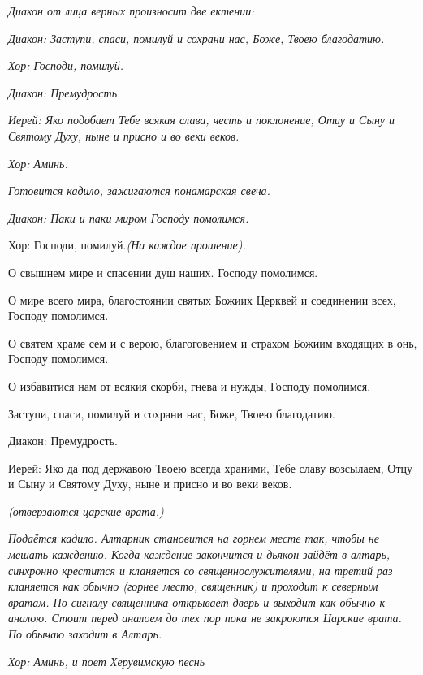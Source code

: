 \itshape Диакон от лица верных произносит две ектении:\normalfont{}


 \itshape  Диакон:\normalfont{} Заступи, спаси, помилуй и сохрани нас, Боже, Твоею благодатию.


\itshape Хор:\normalfont{} Господи, помилуй.


\itshape Диакон:\normalfont{} Премудрость.


\itshape  Иерей:\normalfont{} Яко подобает Тебе всякая слава, честь и поклонение, Отцу и Сыну и Святому Духу, ныне и присно и во веки веков.


\itshape  Хор:\normalfont{} Аминь.


\itshape  Готовится кадило, зажигаются понамарская свеча.\normalfont{}


 \itshape  Диакон:\normalfont{} Паки и паки миром Господу помолимся. \itshape  


  Хор:\normalfont{} Господи, помилуй.\itshape  (На каждое прошение)\normalfont{}. 


  О свышнем мире и спасении душ наших. Господу помолимся. 


  О мире всего мира, благостоянии святых Божиих Церквей и соединении всех, Господу помолимся. 


  О святем храме сем и с верою, благоговением и страхом Божиим входящих в онь, Господу помолимся. 


  О избавитися нам от всякия скорби, гнева и нужды, Господу помолимся. 


  Заступи, спаси, помилуй и сохрани нас, Боже, Твоею благодатию. \itshape 


  Диакон:\normalfont{} Премудрость. \itshape 


  Иерей:\normalfont{} Яко да под державою Твоею всегда храними, Тебе славу возсылаем, Отцу и Сыну и Святому Духу, ныне и присно и во веки веков. 


 \itshape (отверзаются царские врата.)\normalfont{}


 \itshape Подаётся кадило. Алтарник становится на горнем месте так, чтобы не мешать каждению. Когда каждение закончится и дьякон зайдёт в алтарь, синхронно крестится и кланяется со священнослужителями, на третий раз кланяется как обычно (горнее место, священник) и проходит к северным вратам. По сигналу священника открывает дверь и выходит как обычно к аналою. Стоит перед аналоем до тех пор пока не закроются Царские врата. По обычаю заходит в Алтарь\normalfont{}. 


\itshape  Хор:\normalfont{} Аминь, \itshape и поет Херувимскую песнь \normalfont{}


